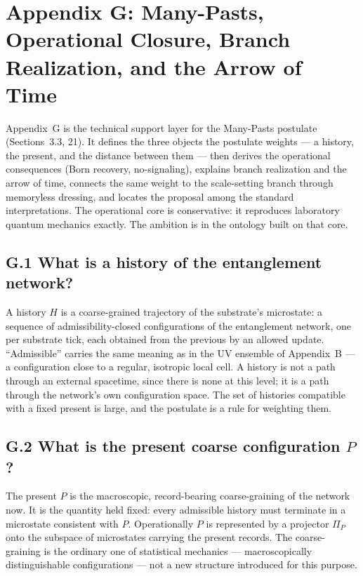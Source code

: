 \documentclass[11pt]{article}
\begin{document}
\section*{Appendix G: Many-Pasts, Operational Closure, Branch Realization, and the Arrow of Time}

Appendix~G is the technical support layer for the Many-Pasts postulate (Sections~3.3, 21). It defines the three objects the postulate weights --- a history, the present, and the distance between them --- then derives the operational consequences (Born recovery, no-signaling), explains branch realization and the arrow of time, connects the same weight to the scale-setting branch through memoryless dressing, and locates the proposal among the standard interpretations. The operational core is conservative: it reproduces laboratory quantum mechanics exactly. The ambition is in the ontology built on that core.

\subsection*{G.1 What is a history of the entanglement network?}

A history $H$ is a coarse-grained trajectory of the substrate's microstate: a sequence of admissibility-closed configurations of the entanglement network, one per substrate tick, each obtained from the previous by an allowed update. ``Admissible'' carries the same meaning as in the UV ensemble of Appendix~B --- a configuration close to a regular, isotropic local cell. A history is not a path through an external spacetime, since there is none at this level; it is a path through the network's own configuration space. The set of histories compatible with a fixed present is large, and the postulate is a rule for weighting them.

\subsection*{G.2 What is the present coarse configuration $P$?}

The present $P$ is the macroscopic, record-bearing coarse-graining of the network now. It is the quantity held fixed: every admissible history must terminate in a microstate consistent with $P$. Operationally $P$ is represented by a projector $\Pi_P$ onto the subspace of microstates carrying the present records. The coarse-graining is the ordinary one of statistical mechanics --- macroscopically distinguishable configurations --- not a new structure introduced for this purpose.
\end{document}
